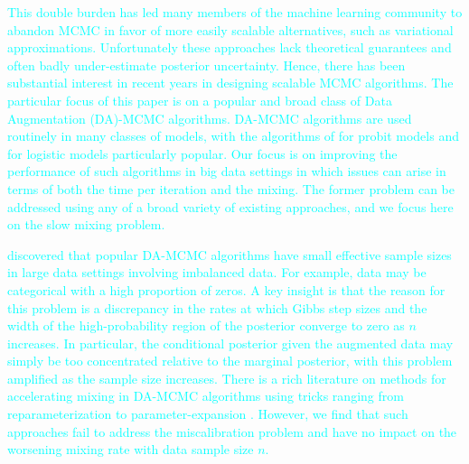\documentclass[11pt]{article}
\newcommand{\dave}[1]{{\textcolor{cyan}{#1}}}
\begin{document}
\dave{This double burden has led many members of the machine learning community to abandon MCMC in favor of more easily scalable alternatives, such as variational approximations. Unfortunately these approaches lack theoretical guarantees and often badly under-estimate posterior uncertainty.  Hence, there has been substantial interest in recent years in designing scalable MCMC algorithms.  The particular focus of this paper is on a popular and broad class of Data Augmentation (DA)-MCMC algorithms.  DA-MCMC algorithms are used routinely in many classes of models, with the algorithms of \cite{albert1993bayesian} for probit models and \cite{polson2013bayesian} for logistic models particularly popular.  Our focus is on improving the performance of such algorithms in big data settings in which issues can arise in terms of both the time per iteration and the mixing.  The former problem can be addressed using any of a broad variety of existing approaches, and we focus here on the slow
mixing problem.}

\dave{ \cite{johndrow2016inefficiency} discovered that popular DA-MCMC algorithms have small effective sample sizes in large data settings involving imbalanced data.  For example, data may be categorical with a high proportion of zeros.  A key insight is that the reason for this problem is a discrepancy in the rates at which Gibbs step sizes and the width of the high-probability region of the posterior converge to zero as $n$ increases.  In particular, the conditional posterior given the augmented data may simply be too concentrated relative to the marginal posterior, with this problem amplified as the sample size increases.  There is a rich literature on methods for accelerating mixing in DA-MCMC algorithms using tricks ranging from reparameterization to parameter-expansion \citep{liu1999parameter,meng1999seeking,papaspiliopoulos2007general}.  However, we find that such approaches fail to address the miscalibration problem and have no impact on the worsening mixing rate with data sample size $n$.}
\end{document}
